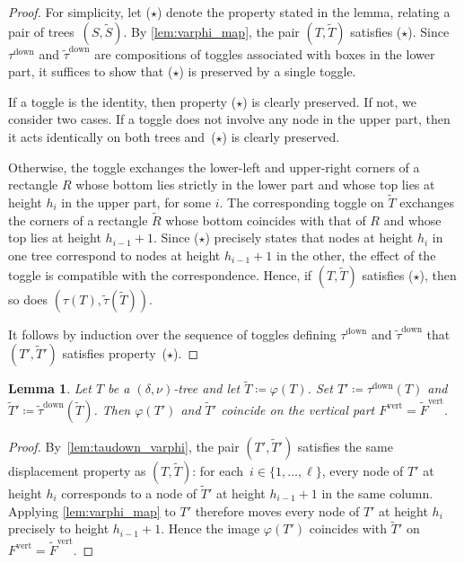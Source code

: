 \documentclass[11pt]{amsart}
\newcounter{height}
\newcommand{\down}{^{\operatorname{down}}}
\newcommand{\ver}{^{\operatorname{vert}}}
\newtheorem{lemma}[theorem]{Lemma}
\theoremstyle{definition}
\begin{document}
\begin{proof}
For simplicity, let ($\star$) denote the property stated in the lemma, relating a pair of trees~$(S,\widetilde S)$. By \cref{lem:varphi_map}, the pair $(T,\widetilde T)$ satisfies ($\star$). Since $\tau\down$ and $\widetilde{\tau}\down$ are compositions of toggles associated with boxes in the lower part, it suffices to show that ($\star$) is preserved by a single toggle.

If a toggle is the identity, then property ($\star$) is clearly preserved. If not, we consider two cases. If a toggle does not involve any node in the upper part, then it acts identically on both trees and~($\star$) is clearly preserved.

Otherwise, the toggle exchanges the lower-left and upper-right corners of a rectangle $R$ whose bottom lies strictly in the lower part and whose top lies at height $h_i$ in the upper part, for some $i$. The corresponding toggle on $\widetilde T$ exchanges the corners of a rectangle $\widetilde R$ whose bottom coincides with that of $R$ and whose top lies at height $h_{i-1}+1$. Since ($\star$) precisely states that nodes at height $h_i$ in one tree correspond to nodes at height $h_{i-1}+1$ in the other, the effect of the toggle is compatible with the correspondence. Hence, if $(T,\widetilde T)$ satisfies ($\star$), then so does $(\tau(T),\widetilde{\tau}(\widetilde T))$.

It follows by induction over the sequence of toggles defining $\tau\down$ and $\widetilde{\tau}\down$ that $(T',\widetilde T')$ satisfies property~($\star$).
\end{proof}

\begin{lemma} \label{lem:varphi_Tprime}
Let $T$ be a $(\delta,\nu)$-tree and let $\widetilde T \coloneqq \varphi(T)$. Set $T' \coloneqq \tau\down(T)$ and $\widetilde T' \coloneqq \widetilde{\tau}\down(\widetilde T)$. Then $\varphi(T')$ and $\widetilde T'$ coincide on the vertical part $F\ver=\widetilde F\ver$.
\end{lemma}

\begin{proof}
By~\cref{lem:taudown_varphi}, the pair $(T',\widetilde T')$ satisfies the same displacement property as $(T,\widetilde T)$: for each~$i\in\{1,\dots,\ell\}$, every node of $T'$ at height $h_i$ corresponds to a node of $\widetilde T'$ at height $h_{i-1}+1$ in the same column. Applying \cref{lem:varphi_map} to $T'$ therefore moves every node of $T'$ at height $h_i$ precisely to height $h_{i-1}+1$. Hence the image $\varphi(T')$ coincides with $\widetilde T'$ on $F\ver=\widetilde F\ver$.
\end{proof}
\end{document}
